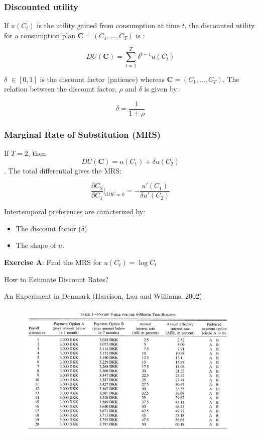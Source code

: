 \documentclass[handout]{beamer}
\begin{document}
\begin{frame}\frametitle{Discounted utility}

If $u(C_t)$ is the utility gained from consumption at time $t$, the discounted utility for a consumption plan $\textbf{C} = (C_1,...,C_T)$ is :


$$ DU(\mathbf{C}) = \sum_{t=1}^T \delta^{t-1} u(C_t) $$

$\delta$ $\in [0,1]$ is the discount factor (patience) whereas $\mathbf{C} = (C_1,...,C_T)$. The relation between the discount factor, $\rho$ and $\delta$ is given by: 

$$ \delta = \frac{1}{1+\rho} $$

\end{frame}

\begin{frame}\frametitle{Marginal Rate of Substitution (MRS)}

If $T=2$, then $$ DU(\textbf{C}) = u(C_1) +  \delta u(C_2) $$. The total differential gives the MRS: 

$$ \frac{\partial C_2}{\partial C_1}\rvert_{dDU=0} = -\frac{u'(C_1)}{\delta u'(C_2)}$$

Intertemporal preferences are caracterized by: 

\begin{itemize}
\item The discount factor ($\delta$)
\item The shape of $u$. 
\end{itemize}

\textbf{Exercise A}: Find the MRS for $u(C_t) = \log C_t$

\end{frame}


\begin{frame}{How to Estimate Discount Rates?}

An Experiment in Denmark  (Harrison, Lau and Williams, 2002)

\begin{figure}
\includegraphics[scale=0.5]{MPL.png}
\end{figure}


\end{frame}
\end{document}
